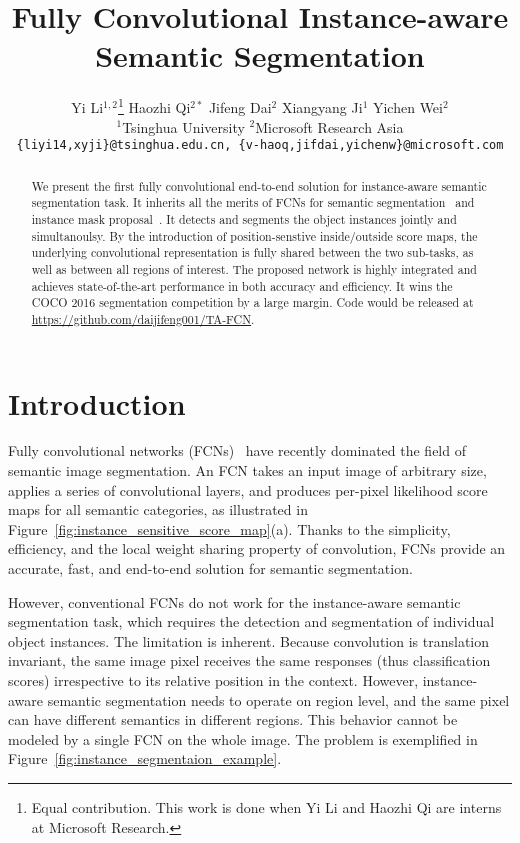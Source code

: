 \documentclass[10pt,twocolumn,letterpaper]{article}
\begin{document}
\title{Fully Convolutional Instance-aware Semantic Segmentation}

\author{Yi Li$^{1,2}$\thanks{Equal contribution. This work is done when Yi Li and Haozhi Qi are interns at Microsoft Research.} \qquad Haozhi Qi$^{2*}$ \qquad Jifeng Dai$^{2}$ \qquad Xiangyang Ji$^1$ \qquad Yichen Wei$^2$\\
$^1$Tsinghua University \qquad \qquad \qquad $^2$Microsoft Research Asia \quad\quad\quad\quad\quad\quad\\
{\tt\small \{liyi14,xyji\}@tsinghua.edu.cn, \{v-haoq,jifdai,yichenw\}@microsoft.com}
}

\maketitle


\begin{abstract}
We present the first fully convolutional end-to-end solution for instance-aware semantic segmentation task. It inherits all the merits of FCNs for semantic segmentation~\cite{long2015fully} and instance mask proposal~\cite{dai2016instance}. It detects and segments the object instances jointly and simultanoulsy. By the introduction of position-senstive inside/outside score maps, the underlying convolutional representation is fully shared between the two sub-tasks, as well as between all regions of interest. The proposed network is highly integrated and achieves state-of-the-art performance in both accuracy and efficiency. It wins the COCO 2016 segmentation competition by a large margin. Code would be released at \url{https://github.com/daijifeng001/TA-FCN}.

\end{abstract}

\section{Introduction}
\label{sec.intro}
Fully convolutional networks (FCNs)~\cite{long2015fully} have recently dominated the field of semantic image segmentation. An FCN takes an input image of arbitrary size, applies a series of convolutional layers, and produces per-pixel likelihood score maps for all semantic categories, as illustrated in Figure~\ref{fig:instance_sensitive_score_map}(a). Thanks to the simplicity, efficiency, and the local weight sharing property of convolution, FCNs provide an accurate, fast, and end-to-end solution for semantic segmentation.

However, conventional FCNs do not work for the instance-aware semantic segmentation task, which requires the detection and segmentation of individual object instances. The limitation is inherent. Because convolution is translation invariant, the same image pixel receives the same responses (thus classification scores) irrespective to its relative position in the context. However, instance-aware semantic segmentation needs to operate on region level, and the same pixel can have different semantics in different regions. This behavior cannot be modeled by a single FCN on the whole image. The problem is exemplified in Figure~\ref{fig:instance_segmentaion_example}.
\end{document}
